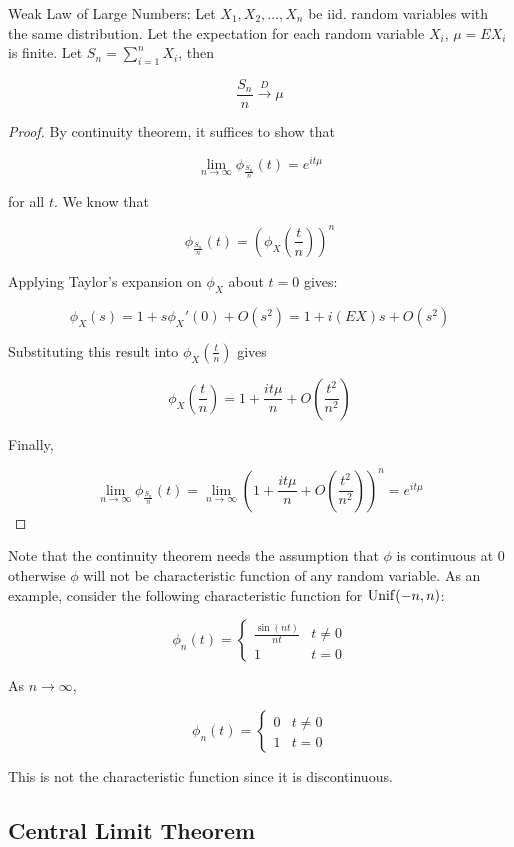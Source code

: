 \begin{theorem}
	Weak Law of Large Numbers: Let $X_1, X_2, \dots, X_n$ be iid. random variables with the same distribution. Let the expectation for each random variable $X_i$, $\mu=EX_i$ is finite. Let $S_n = \sum_{i=1}^n X_i$, then
	
	\[\frac{S_n}{n} \xrightarrow{D} \mu\]
\end{theorem}
\begin{proof}
	By continuity theorem, it suffices to show that
	
	\[\lim_{n\to\infty} \phi_{\frac{S_n}{n}}(t)=e^{it\mu}\]
	
	for all $t$. We know that
	
	\[\phi_{\frac{S_n}{n}}(t)=\left( \phi_X\left( \frac{t}{n} \right) \right)^n\]
	
	Applying Taylor's expansion on $\phi_X$ about $t=0$ gives:
	
	\[\phi_X(s)=1+s\phi_X'(0)+O(s^2)=1+i(EX)s+O(s^2)\]
	
	Substituting this result into $\phi_X\left( \frac{t}{n} \right)$ gives
	
	\[\phi_X\left( \frac{t}{n} \right)=1+\frac{it\mu}{n}+O\left(\frac{t^2}{n^2}\right)\]
	
	Finally,
	
	\[\lim_{n\to\infty} \phi_{\frac{S_n}{n}}(t)= \lim_{n\to\infty} \left( 1+\frac{it\mu}{n}+O\left(\frac{t^2}{n^2}\right) \right)^n=e^{it\mu}\]
\end{proof}

Note that the continuity theorem needs the assumption that $\phi$ is continuous at $0$ otherwise $\phi$ will not be characteristic function of any random variable. As an example, consider the following characteristic function for $\operatorname{Unif}(-n,n)$:

\[\phi_n(t)=\begin{cases} \frac{\sin(nt)}{nt} & t \ne 0 \\ 1 & t = 0 \end{cases}\]

As $n\to\infty$,

\[\phi_n(t)=\begin{cases} 0 & t \ne 0 \\ 1 & t = 0 \end{cases}\]

This is not the characteristic function since it is discontinuous.

\subsection{Central Limit Theorem}


